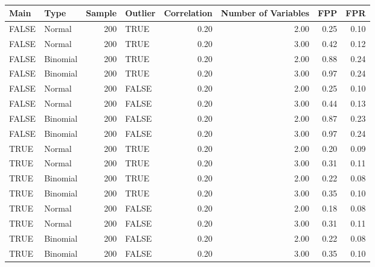 \begin{longtable}{llrlrrrr}
\caption{} \\ 
  \hline
Main & Type & Sample & Outlier & Correlation & Number of Variables & FPP & FPR \\ 
  \hline
FALSE & Normal & 200 & TRUE & 0.20 & 2.00 & 0.25 & 0.10 \\ 
  FALSE & Normal & 200 & TRUE & 0.20 & 3.00 & 0.42 & 0.12 \\ 
  FALSE & Binomial & 200 & TRUE & 0.20 & 2.00 & 0.88 & 0.24 \\ 
  FALSE & Binomial & 200 & TRUE & 0.20 & 3.00 & 0.97 & 0.24 \\ 
  FALSE & Normal & 200 & FALSE & 0.20 & 2.00 & 0.25 & 0.10 \\ 
  FALSE & Normal & 200 & FALSE & 0.20 & 3.00 & 0.44 & 0.13 \\ 
  FALSE & Binomial & 200 & FALSE & 0.20 & 2.00 & 0.87 & 0.23 \\ 
  FALSE & Binomial & 200 & FALSE & 0.20 & 3.00 & 0.97 & 0.24 \\ 
  TRUE & Normal & 200 & TRUE & 0.20 & 2.00 & 0.20 & 0.09 \\ 
  TRUE & Normal & 200 & TRUE & 0.20 & 3.00 & 0.31 & 0.11 \\ 
  TRUE & Binomial & 200 & TRUE & 0.20 & 2.00 & 0.22 & 0.08 \\ 
  TRUE & Binomial & 200 & TRUE & 0.20 & 3.00 & 0.35 & 0.10 \\ 
  TRUE & Normal & 200 & FALSE & 0.20 & 2.00 & 0.18 & 0.08 \\ 
  TRUE & Normal & 200 & FALSE & 0.20 & 3.00 & 0.31 & 0.11 \\ 
  TRUE & Binomial & 200 & FALSE & 0.20 & 2.00 & 0.22 & 0.08 \\ 
  TRUE & Binomial & 200 & FALSE & 0.20 & 3.00 & 0.35 & 0.10 \\ 
   \hline
\hline
\end{longtable}
